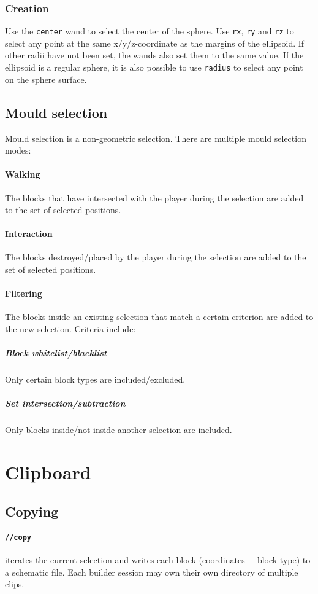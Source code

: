 \documentclass{report}
\begin{document}
				\subsubsection{Creation} Use the \texttt{center} wand to select the center of the sphere. Use
				\texttt{rx}, \texttt{ry} and \texttt{rz} to select any point at the same x/y/z-coordinate as the margins
				of the ellipsoid. If other radii have not been set, the wands also set them to the same value. If the
				ellipsoid is a regular sphere, it is also possible to use \texttt{radius} to select any point on the
				sphere surface.

			\subsection{Mould selection}
				Mould selection is a non-geometric selection. There are multiple mould selection modes:
				\paragraph{Walking} The blocks that have intersected with the player during the selection are added
				to the set of selected positions.
				\paragraph{Interaction} The blocks destroyed/placed by the player during the selection are added to the
				set of selected positions.
				\paragraph{Filtering} The blocks inside an existing selection that match a certain criterion are added
				to the new selection. Criteria include:
					\subparagraph{Block whitelist/blacklist} Only certain block types are included/excluded.
					\subparagraph{Set intersection/subtraction} Only blocks inside/not inside another selection are
					included.

		\section{Clipboard}
			\label{sec:clipboard}
			\subsection{Copying}
				\paragraph{\texttt{//copy}} iterates the current selection and writes each block (coordinates + block
				type) to a schematic file. Each builder session may own their own directory of multiple clips.
\end{document}
